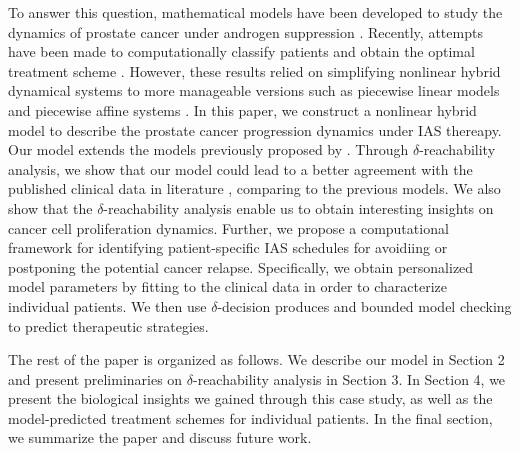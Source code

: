To answer this question, mathematical models have been developed to study the dynamics of prostate cancer under androgen suppression \citep{jackson04,ideta08, hirata10,pnas11}. Recently, attempts have been made to computationally classify patients and obtain the optimal treatment scheme \citep{chaos10,suzuki10}. However, these results relied on simplifying nonlinear hybrid dynamical systems to more manageable versions such as piecewise linear models \citep{chaos10} and piecewise affine systems \citep{suzuki10}. In this paper, we construct a nonlinear hybrid model to describe the prostate cancer progression dynamics under IAS thereapy. Our model extends the models previously proposed by \citep{jackson04,ideta08}. Through $\delta$-reachability analysis, we show that our model could lead to a better agreement with the published clinical data in literature \cite{ bruchovsky06,bruchovsky07}, comparing to the previous models. We also show that the $\delta$-reachability analysis enable us to obtain interesting insights on cancer cell proliferation dynamics. Further, we propose a computational framework for identifying patient-specific IAS schedules for avoidiing or postponing the potential cancer relapse. Specifically, we obtain personalized model parameters by fitting to the clinical data in order to characterize individual patients. We then use $\delta$-decision produces and bounded model checking to predict therapeutic strategies. 

The rest of the paper is organized as follows. We describe our model in Section 2 and present preliminaries on $\delta$-reachability analysis in Section 3. In Section 4, we present the biological insights we gained through this case study, as well as the model-predicted treatment schemes for individual patients. In the final section, we summarize the paper and discuss future work.
